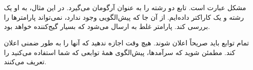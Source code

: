 \section{}
\paragraph{}\label{answer:41}
مشکل عبارت  است. تابع  دو رشته را به عنوان آرگومان می‌گیرد. در این مثال، به او یک رشته و یک کاراکتر داده‌ایم. از آن جا که پیش‌الگویی وجود ندارد،  نمی‌تواند پارامترها را بررسی کند. پارامتر غلط به  ارسال می‌شود که بسیار گیج‌کننده خواهد بود.

تمام توابع باید صریحاً اعلان شوند. هیچ وقت اجازه ندهید که  آنها را به طور ضمنی اعلان کند. مطمئن شوید که سرآمدها، پیش‌الگوی همهٔ توابعی که شما استفاده می‌کنید را تعریف می‌کنند.
